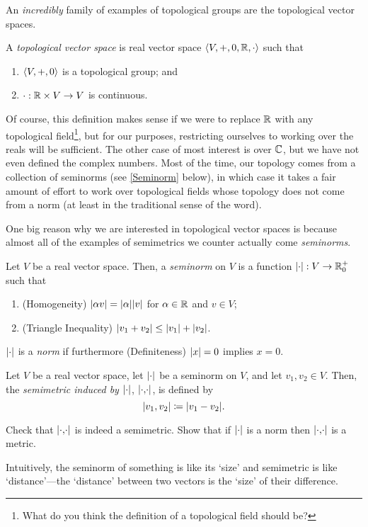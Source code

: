 An \emph{incredibly} family of examples of topological groups are the topological vector spaces.
\begin{dfn}
A \emph{topological vector space} is real vector space $\langle V,+,0,\mathbb{R} ,\cdot\rangle$ such that
\begin{enumerate}
\item $\langle V,+,0\rangle$ is a topological group; and
\item $\cdot :\mathbb{R} \times V\rightarrow V$ is continuous.
\end{enumerate}
\begin{rmk}
Of course, this definition makes sense if we were to replace $\mathbb{R}$ with any topological field\footnote{What do you think the definition of a topological field should be?}, but for our purposes, restricting ourselves to working over the reals will be sufficient.  The other case of most interest is over $\mathbb{C}$, but we have not even defined the complex numbers.  Most of the time, our topology comes from a collection of seminorms (see \cref{Seminorm} below), in which case it takes a fair amount of effort to work over topological fields whose topology does not come from a norm (at least in the traditional sense of the word).
\end{rmk}
\end{dfn}
One big reason why we are interested in topological vector spaces is because almost all of the examples of semimetrics we counter actually come \emph{seminorms}.
\begin{dfn}\label{Seminorm}
Let $V$ be a real vector space.  Then, a \emph{seminorm} on $V$ is a function $\norm :V\rightarrow \R _0^+$ such that
\begin{enumerate}
\item (Homogeneity) $\norm[\alpha v]=\norm[\alpha ]\norm[v]$ for $\alpha \in \mathbb{R}$ and $v\in V$;
\item (Triangle Inequality) $\norm[v_1+v_2]\leq \norm[v_1]+\norm[v_2]$.
\end{enumerate}
$\norm$ is a \emph{norm} if furthermore (Definiteness) $\norm[x]=0$ implies $x=0$.
\end{dfn}
\begin{dfn}
Let $V$ be a real vector space, let $\norm$ be a seminorm on $V$, and let $v_1,v_2\in V$.  Then, the \emph{semimetric induced by $\norm$}, $\metric$, is defined by
\begin{equation}
\metric[v_1][v_2]\coloneqq \norm[v_1-v_2].
\end{equation}
\begin{exr}
Check that $\metric$ is indeed a semimetric.  Show that if $\norm$ is a norm then $\metric$ is a metric.
\end{exr}
\begin{rmk}
Intuitively, the seminorm of something is like its `size' and semimetric is like `distance'---the `distance' between two vectors is the `size' of their difference.
\end{rmk}
\end{dfn}
